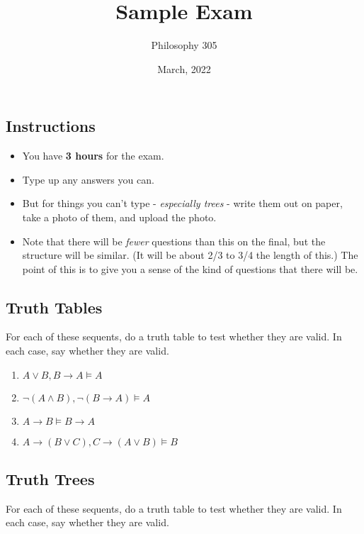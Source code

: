 \documentclass[
  11pt,
]{article}
\title{Sample Exam}
\author{Philosophy 305}
\date{March, 2022}
\providecommand{\tightlist}{%
  \setlength{\itemsep}{0pt}\setlength{\parskip}{0pt}}
\begin{document}
\maketitle

\hypertarget{instructions}{%
\subsection{Instructions}\label{instructions}}

\begin{itemize}
\tightlist
\item
  You have \textbf{3 hours} for the exam.
\item
  Type up any answers you can.
\item
  But for things you can't type - \emph{especially trees} - write them
  out on paper, take a photo of them, and upload the photo.
\item
  Note that there will be \emph{fewer} questions than this on the final,
  but the structure will be similar. (It will be about 2/3 to 3/4 the
  length of this.) The point of this is to give you a sense of the kind
  of questions that there will be.
\end{itemize}

\hypertarget{truth-tables}{%
\subsection{Truth Tables}\label{truth-tables}}

For each of these sequents, do a truth table to test whether they are
valid. In each case, say whether they are valid.

\begin{enumerate}
\def\labelenumi{\arabic{enumi}.}
\tightlist
\item
  \(A \vee B, B \rightarrow A \vDash A\)
\item
  \(\neg (A \wedge B), \neg (B \rightarrow A) \vDash A\)
\item
  \(A \rightarrow B \vDash B \rightarrow A\)
\item
  \(A \rightarrow (B \vee C), C \rightarrow (A \vee B) \vDash B\)
\end{enumerate}

\hypertarget{truth-trees}{%
\subsection{Truth Trees}\label{truth-trees}}

For each of these sequents, do a truth table to test whether they are
valid. In each case, say whether they are valid.
\end{document}
